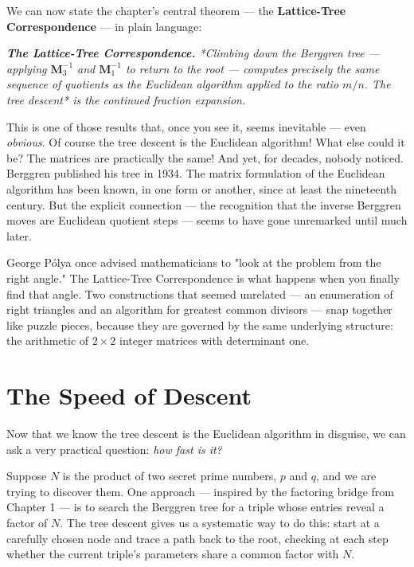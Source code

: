 \documentclass[11pt,openright,twoside]{book}
\renewenvironment{quotation}{%
  \par\vspace{8pt}%
  \begin{list}{}{%
    \setlength{\leftmargin}{2em}%
    \setlength{\rightmargin}{2em}%
  }\item[]\itshape\color{pullquote}%
}{%
  \end{list}%
  \par\vspace{8pt}%
}
\theoremstyle{definition}
\begin{document}
We can now state the chapter's central theorem --- the \textbf{Lattice-Tree Correspondence} --- in plain language:

\begin{quotation}
\noindent\itshape \textbf{The Lattice-Tree Correspondence.} *Climbing down the Berggren tree --- applying $\mathbf{M}_3^{-1}$ and $\mathbf{M}_1^{-1}$ to return to the root --- computes precisely the same sequence of quotients as the Euclidean algorithm applied to the ratio $m/n$. The tree descent* is \textit{the continued fraction expansion.}
\end{quotation}

This is one of those results that, once you see it, seems inevitable --- even \textit{obvious}. Of course the tree descent is the Euclidean algorithm! What else could it be? The matrices are practically the same! And yet, for decades, nobody noticed. Berggren published his tree in 1934. The matrix formulation of the Euclidean algorithm has been known, in one form or another, since at least the nineteenth century. But the explicit connection --- the recognition that the inverse Berggren moves are Euclidean quotient steps --- seems to have gone unremarked until much later.

George Pólya once advised mathematicians to "look at the problem from the right angle." The Lattice-Tree Correspondence is what happens when you finally find that angle. Two constructions that seemed unrelated --- an enumeration of right triangles and an algorithm for greatest common divisors --- snap together like puzzle pieces, because they are governed by the same underlying structure: the arithmetic of $2 \times 2$ integer matrices with determinant one.


\bigskip


\section{The Speed of Descent}

Now that we know the tree descent is the Euclidean algorithm in disguise, we can ask a very practical question: \textit{how fast is it?}

Suppose $N$ is the product of two secret prime numbers, $p$ and $q$, and we are trying to discover them. One approach --- inspired by the factoring bridge from Chapter 1 --- is to search the Berggren tree for a triple whose entries reveal a factor of $N$. The tree descent gives us a systematic way to do this: start at a carefully chosen node and trace a path back to the root, checking at each step whether the current triple's parameters share a common factor with $N$.
\end{document}
